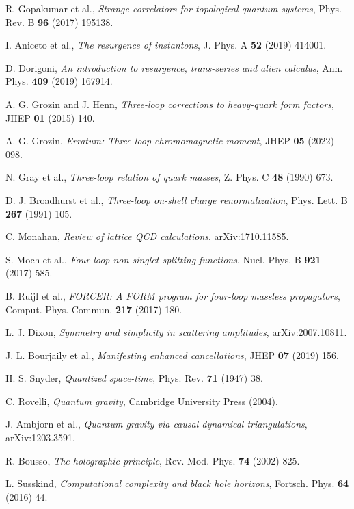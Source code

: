 \documentclass[11pt,a4paper]{article}
\theoremstyle{definition}
\theoremstyle{remark}
\begin{document}
\begin{thebibliography}{99}
 R. Gopakumar et al., \emph{Strange correlators for topological quantum systems}, Phys. Rev. B \textbf{96} (2017) 195138.

 I. Aniceto et al., \emph{The resurgence of instantons}, J. Phys. A \textbf{52} (2019) 414001.

 D. Dorigoni, \emph{An introduction to resurgence, trans-series and alien calculus}, Ann. Phys. \textbf{409} (2019) 167914.

 A. G. Grozin and J. Henn, \emph{Three-loop corrections to heavy-quark form factors}, JHEP \textbf{01} (2015) 140.

 A. G. Grozin, \emph{Erratum: Three-loop chromomagnetic moment}, JHEP \textbf{05} (2022) 098.

 N. Gray et al., \emph{Three-loop relation of quark masses}, Z. Phys. C \textbf{48} (1990) 673.

 D. J. Broadhurst et al., \emph{Three-loop on-shell charge renormalization}, Phys. Lett. B \textbf{267} (1991) 105.

 C. Monahan, \emph{Review of lattice QCD calculations}, arXiv:1710.11585.

 S. Moch et al., \emph{Four-loop non-singlet splitting functions}, Nucl. Phys. B \textbf{921} (2017) 585.

 B. Ruijl et al., \emph{FORCER: A FORM program for four-loop massless propagators}, Comput. Phys. Commun. \textbf{217} (2017) 180.

 L. J. Dixon, \emph{Symmetry and simplicity in scattering amplitudes}, arXiv:2007.10811.

 J. L. Bourjaily et al., \emph{Manifesting enhanced cancellations}, JHEP \textbf{07} (2019) 156.

 H. S. Snyder, \emph{Quantized space-time}, Phys. Rev. \textbf{71} (1947) 38.

 C. Rovelli, \emph{Quantum gravity}, Cambridge University Press (2004).

 J. Ambjorn et al., \emph{Quantum gravity via causal dynamical triangulations}, arXiv:1203.3591.

 R. Bousso, \emph{The holographic principle}, Rev. Mod. Phys. \textbf{74} (2002) 825.

 L. Susskind, \emph{Computational complexity and black hole horizons}, Fortsch. Phys. \textbf{64} (2016) 44.


\end{thebibliography}
\end{document}
